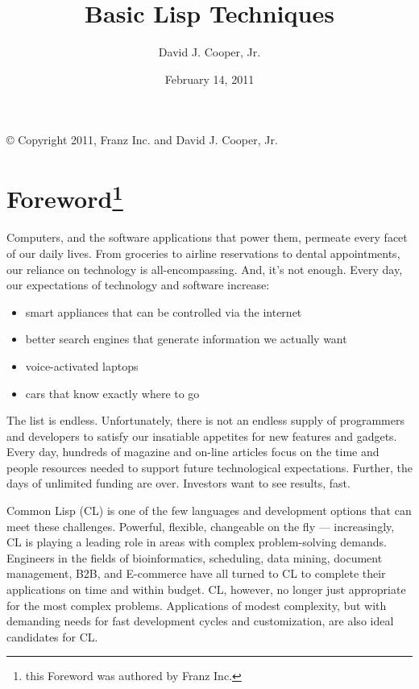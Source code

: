 \documentclass[11pt]{book}
\title{Basic Lisp Techniques}
\author{David J. Cooper, Jr.}
\date{February 14, 2011}
\begin{document}
\frontmatter

\maketitle

\clearpage
\thispagestyle{empty}
\vspace*{\fill}
\begin{center}
\copyright{} Copyright 2011, Franz Inc. and David J. Cooper, Jr.
\end{center}
\vspace*{\fill}
\clearpage

\chapter*{Foreword\footnote{this Foreword was authored by Franz Inc.}}

Computers, and the software applications that power them, permeate every facet of our
daily lives. From groceries to airline reservations to dental appointments, our reliance
on technology is all-encompassing. And, it's not enough. Every day, our expectations of
technology and software increase:

\begin{itemize}
\item smart appliances that can be controlled via the internet
\item better search engines that generate information we actually want
\item voice-activated laptops
\item cars that know exactly where to go
\end{itemize}

The list is endless. Unfortunately, there is not an endless supply of programmers and
developers to satisfy our insatiable appetites for new features and gadgets. Every day,
hundreds of magazine and on-line articles focus on the time and people resources needed to
support future technological expectations. Further, the days of unlimited funding are over.
Investors want to see results, fast.

Common Lisp (CL) is one of the few languages and development options that can meet
these challenges. Powerful, flexible, changeable on the fly --- increasingly, CL is playing
a leading role in areas with complex problem-solving demands. Engineers in the fields of
bioinformatics, scheduling, data mining, document management, B2B, and E-commerce
have all turned to CL to complete their applications on time and within budget. CL,
however, no longer just appropriate for the most complex problems. Applications of modest
complexity, but with demanding needs for fast development cycles and customization, are
also ideal candidates for CL.
\end{document}
